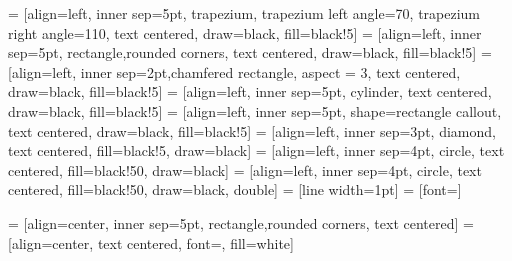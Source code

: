 \usetikzlibrary {intersections,through,arrows.meta,graphs,shapes.misc,positioning,shapes.misc,positioning,calc}
\usetikzlibrary{animations}
\usetikzlibrary {shapes.geometric}
\usetikzlibrary {animations}
\usetikzlibrary {shapes.multipart}
\usetikzlibrary {positioning}
\usetikzlibrary {fit,shapes.geometric}
\usetikzlibrary {automata}
\usetikzlibrary {quotes}
\usetikzlibrary {matrix}
\usetikzlibrary {backgrounds}
\usetikzlibrary {scopes}
\usetikzlibrary {calc}
\usetikzlibrary {intersections}
\usetikzlibrary {svg.path}
\usetikzlibrary {decorations}
\usetikzlibrary {patterns}
\usetikzlibrary {decorations.pathmorphing}
\usetikzlibrary {shadows}
\usetikzlibrary {bending}

 = [align=left, inner sep=5pt, trapezium, trapezium left angle=70, trapezium right angle=110, text centered, draw=black, fill=black!5]
 = [align=left, inner sep=5pt, rectangle,rounded corners, text centered, draw=black, fill=black!5]
 = [align=left, inner sep=2pt,chamfered rectangle, aspect = 3, text centered, draw=black, fill=black!5]
 = [align=left, inner sep=5pt, cylinder, text centered, draw=black, fill=black!5]
 = [align=left, inner sep=5pt, shape=rectangle callout, text centered, draw=black, fill=black!5]
 = [align=left, inner sep=3pt, diamond, text centered, fill=black!5, draw=black]
 = [align=left, inner sep=4pt, circle, text centered, fill=black!50, draw=black]
 = [align=left, inner sep=4pt, circle, text centered, fill=black!50, draw=black, double]
 = [line width=1pt]
 = [font=\normalsize]

 = [align=center, inner sep=5pt, rectangle,rounded corners, text centered]
 = [align=center, text centered, font=\scriptsize, fill=white]
